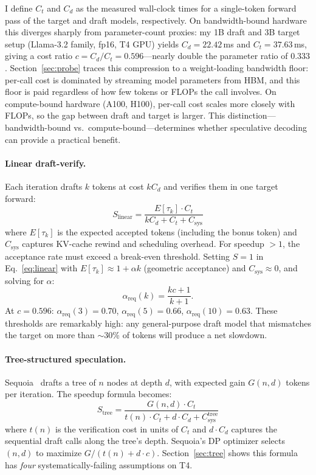 \documentclass[letterpaper,twocolumn,10pt]{article}
\begin{document}
I define $C_t$ and $C_d$ as the measured wall-clock times for a single-token forward pass of the target and draft models, respectively.
On bandwidth-bound hardware this diverges sharply from parameter-count proxies: my 1B draft and 3B target setup (Llama-3.2 family, fp16, T4 GPU) yields $C_d = 22.42$\,ms and $C_t = 37.63$\,ms, giving a cost ratio $c = C_d/C_t = 0.596$---nearly double the parameter ratio of $0.333$.
Section~\ref{sec:probe} traces this compression to a weight-loading bandwidth floor: per-call cost is dominated by streaming model parameters from HBM, and this floor is paid regardless of how few tokens or FLOPs the call involves.
On compute-bound hardware (A100, H100), per-call cost scales more closely with FLOPs, so the gap between draft and target is larger.
This distinction---bandwidth-bound vs.\ compute-bound---determines whether speculative decoding can provide a practical benefit.

\paragraph{Linear draft-verify.}
Each iteration drafts $k$ tokens at cost $kC_d$ and verifies them in one target forward:
\begin{equation}
\label{eq:linear}
S_{\text{linear}} = \frac{E[\tau_k] \cdot C_t}{kC_d + C_t + C_{\text{sys}}}
\end{equation}
where $E[\tau_k]$ is the expected accepted tokens (including the bonus token) and $C_{\text{sys}}$ captures KV-cache rewind and scheduling overhead.
For speedup $> 1$, the acceptance rate must exceed a break-even threshold.
Setting $S = 1$ in Eq.~\ref{eq:linear} with $E[\tau_k] \approx 1 + \alpha k$ (geometric acceptance) and $C_{\text{sys}} \approx 0$, and solving for $\alpha$:
\begin{equation}
\label{eq:breakeven}
\alpha_{\text{req}}(k) = \frac{kc + 1}{k + 1}.
\end{equation}
At $c = 0.596$: $\alpha_{\text{req}}(3) = 0.70$, $\alpha_{\text{req}}(5) = 0.66$, $\alpha_{\text{req}}(10) = 0.63$.
These thresholds are remarkably high: any general-purpose draft model that mismatches the target on more than $\sim$30\% of tokens will produce a net slowdown.

\paragraph{Tree-structured speculation.}
Sequoia~\cite{chen2024sequoia} drafts a tree of $n$ nodes at depth $d$, with expected gain $G(n,d)$ tokens per iteration.
The speedup formula becomes:
\begin{equation}
\label{eq:tree}
S_{\text{tree}} = \frac{G(n,d) \cdot C_t}{t(n) \cdot C_t + d \cdot C_d + C_{\text{sys}}^{\text{tree}}}
\end{equation}
where $t(n)$ is the verification cost in units of $C_t$ and $d \cdot C_d$ captures the sequential draft calls along the tree's depth.
Sequoia's DP optimizer selects $(n, d)$ to maximize $G/(t(n) + d \cdot c)$.
Section~\ref{sec:tree} shows this formula has \emph{four} systematically-failing assumptions on T4.
\end{document}
